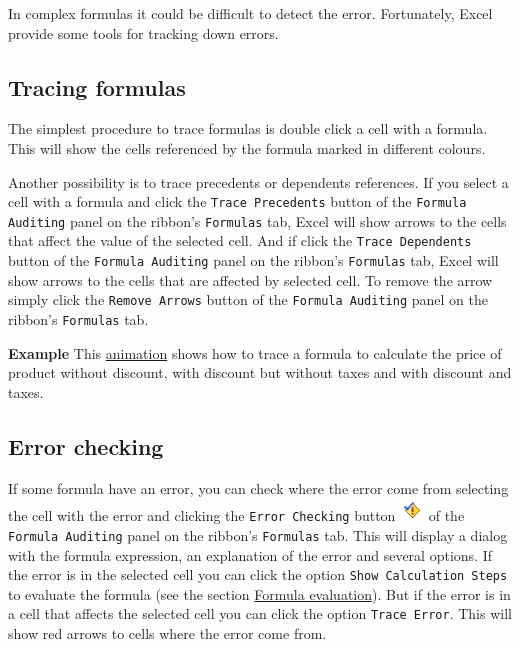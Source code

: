 In complex formulas it could be difficult to detect the error. Fortunately, Excel provide some tools for tracking down errors.

\subsection{Tracing formulas}\hypertarget{tracing-formulas}{}\label{tracing-formulas}

The simplest procedure to trace formulas is double click a cell with a formula. This will show the cells referenced by the formula marked in different colours.

Another possibility is to trace precedents or dependents references. If you select a cell with a formula and click the \texttt{Trace Precedents} button of the \texttt{Formula Auditing} panel on the ribbon's \texttt{Formulas} tab, Excel will show arrows to the cells that affect the value of the selected cell. And if click the \texttt{Trace Dependents} button of the \texttt{Formula Auditing} panel on the ribbon's \texttt{Formulas} tab, Excel will show arrows to the cells that are affected by selected cell. To remove the arrow simply click the \texttt{Remove Arrows} button of the \texttt{Formula Auditing} panel on the ribbon's \texttt{Formulas} tab.

\textbf{Example} This \href{http://aprendeconalf.es/office/excel/manual/img/example_formula_trace.gif}{animation} shows how to trace a formula to calculate the price of product without discount, with discount but without taxes and with discount and taxes.

\subsection{Error checking}\hypertarget{error-checking}{}\label{error-checking}

If some formula have an error, you can check where the error come from selecting the cell with the error and clicking
the \texttt{Error Checking} button \includegraphics[scale=0.7]{../img/button_error_checking.png} of the \texttt{Formula
Auditing} panel on the ribbon's \texttt{Formulas} tab. This will display a dialog with the formula expression, an explanation of the error and several options. If the error is in the selected cell you can click the option \texttt{Show Calculation Steps} to evaluate the formula (see the section \hyperlink{formula\_evaluation}{Formula evaluation}). But if the error is in a cell that affects the selected cell you can click the option \texttt{Trace Error}. This will show red arrows to cells where the error come from.

